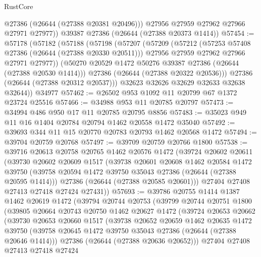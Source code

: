 \begin{lexlean}{RustCore}
\begin{coremodule}
          @27386
          (@26644 (@27388 @20381 @20496)))
        @27956
        @27959
        @27962
        @27966
        @27971
        @27977))
    @39387
    @27386
    (@26644 (@27388 @20373 @1414))
@57454 := @57178
    (@57182
      (@57188
        (@57198
          (@57207
            (@57209
              (@57212
                (@57253 @57408 @27386 (@26644 (@27388 @20330 @20511)))
                @27956
                @27959
                @27962
                @27966
                @27971
                @27977))
            (@50270 @20529 @1472 @50276 @39387 @27386 (@26644 (@27388 @20530 @1414)))
            @27386
            (@26644 (@27388 @20322 @20536)))
          @27386
          (@26644 (@27388 @20312 @20537)))
        @32623
        @32626
        @32629
        @32633
        @32638
        @32644))
    @34977
@57462 := @26502 @953 @1092 @11 @20799 @67 @1372 @23724 @25516
@57466 := @34988 @953 @11 @20785 @20797
@57473 := @34994 @486 @950 @17 @11 @20785 @20795 @8856
@57483 := @35023 @949 @11 @16 @1404 @20784 @20794 @1462 @20558 @1472 @35040
@57492 := @39693 @344 @11 @15 @20770 @20783 @20793 @1462 @20568 @1472
@57494 := @39704 @20759 @20768
@57497 := @39709 @20759 @20766 @1800
@57538 := @39716
    @20613
    @20758
    @20765
    @1462
    @20576
    @1472
    (@39724
      @20602
      @20611
      (@39730
        @20602
        @20609
        @1517
        (@39738
          @20601
          @20608
          @1462
          @20584
          @1472
          @39750
          (@39758 @20594 @1472 @39750 @35043 @27386 (@26644 (@27388 @20595 @1414)))
          @27386
          (@26644 (@27388 @20585 @20601)))
        @27404
        @27408
        @27413
        @27418
        @27424
        @27431))
@57693 := @39786
    @20755
    @1414
    @1387
    @1462
    @20619
    @1472
    (@39794
      @20744
      @20753
      (@39799
        @20744
        @20751
        @1800
        (@39805
          @20664
          @20743
          @20750
          @1462
          @20627
          @1472
          (@39724
            @20653
            @20662
            (@39730
              @20653
              @20660
              @1517
              (@39738
                @20652
                @20659
                @1462
                @20635
                @1472
                @39750
                (@39758 @20645 @1472 @39750 @35043 @27386 (@26644 (@27388 @20646 @1414)))
                @27386
                (@26644 (@27388 @20636 @20652)))
              @27404
              @27408
              @27413
              @27418
              @27424

\end{coremodule}
\end{lexlean}
